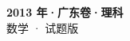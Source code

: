 \documentclass[zihao=-4, a4paper]{ctexart}
\begin{document}
\begin{center}
  {\Large\bfseries 2013 年·广东卷·理科}\\[4pt]
  {\large 数学 · 试题版}
\end{center}
\medskip
{}

\end{document}
